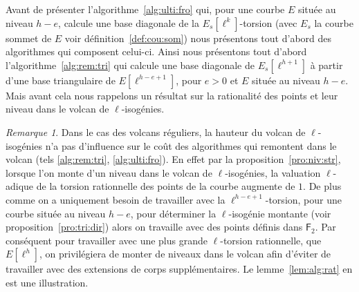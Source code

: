 \documentclass[10pt,a4paper]{book}
\theoremstyle{plain}
\theoremstyle{definition}
\theoremstyle{definition}
\theoremstyle{definition}
\newtheorem{prop}[thm]{Proposition}
\theoremstyle{definition}
\theoremstyle{remark}
\newtheorem{rem}[thm]{Remarque}
\theoremstyle{remark}
\theoremstyle{definition}
\begin{document}
Avant de présenter l'algorithme~\ref{alg:ulti:fro} qui, pour une courbe $E$ 
située au niveau $h-e$, calcule une base diagonale de la $E_s[\ell^k]$-torsion 
(avec $E_s$ la courbe sommet de $E$ voir définition~\ref{def:cou:som}) nous 
présentons tout d'abord des algorithmes qui composent celui-ci.
Ainsi nous présentons tout d'abord l'algorithme~\ref{alg:rem:tri} qui calcule
une base diagonale de $E_s[\ell^{h+1}]$ à partir d'une base triangulaire de 
$E[\ell^{h-e+1}]$, pour $e>0$ et $E$ située au niveau $h-e$. Mais avant cela 
nous rappelons un résultat sur la rationalité des points et leur niveau dans le
volcan de $\ell$-isogénies.
%



\begin{rem}
\label{rem:rat:niv:vol}
Dans le cas des volcans réguliers, la hauteur du volcan de $\ell$-isogénies 
n'a pas d'influence sur le coût des algorithmes qui remontent dans le volcan 
(tels \ref{alg:rem:tri}, \ref{alg:ulti:fro}). En effet par la 
proposition~\ref{pro:niv:str}, lorsque l'on monte d'un niveau dans
le volcan de $\ell$-isogénies, la valuation $\ell$-adique de la torsion
rationnelle des points de la courbe augmente de $1$. De plus comme on a 
uniquement besoin de travailler avec la $\ell^{h-e+1}$-torsion, pour une courbe 
située au niveau $h-e$, pour déterminer la $\ell$-isogénie montante (voir 
proposition~\ref{pro:tri:dir}) alors on travaille avec des points définis dans 
$\mathsf{F}_2$. Par conséquent pour travailler avec
une plus grande $\ell$-torsion rationnelle, que $E[\ell^h]$, on privilégiera 
de monter de niveaux dans le volcan afin d'éviter de travailler avec des 
extensions de corps supplémentaires. Le lemme~\ref{lem:alg:rat} en est une illustration.
\end{rem}
\end{document}
